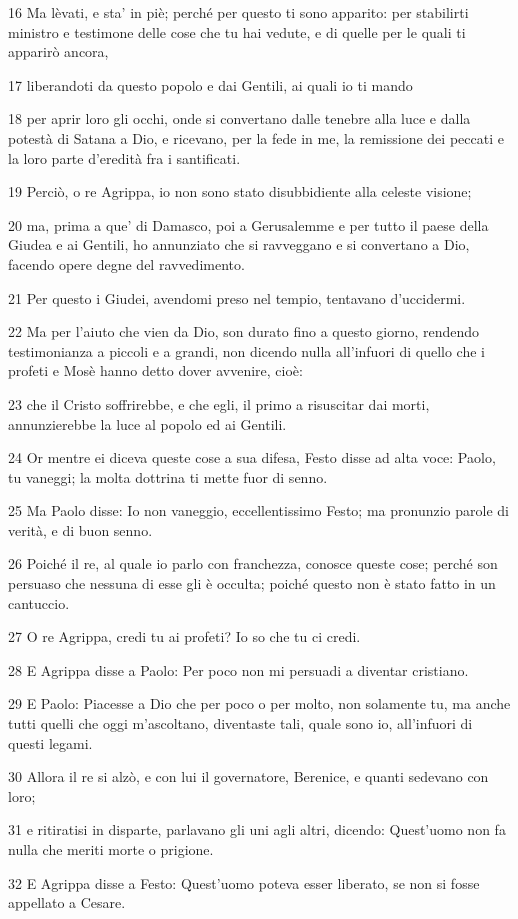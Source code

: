 \par 16 Ma lèvati, e sta' in piè; perché per questo ti sono apparito: per stabilirti ministro e testimone delle cose che tu hai vedute, e di quelle per le quali ti apparirò ancora,
\par 17 liberandoti da questo popolo e dai Gentili, ai quali io ti mando
\par 18 per aprir loro gli occhi, onde si convertano dalle tenebre alla luce e dalla potestà di Satana a Dio, e ricevano, per la fede in me, la remissione dei peccati e la loro parte d'eredità fra i santificati.
\par 19 Perciò, o re Agrippa, io non sono stato disubbidiente alla celeste visione;
\par 20 ma, prima a que' di Damasco, poi a Gerusalemme e per tutto il paese della Giudea e ai Gentili, ho annunziato che si ravveggano e si convertano a Dio, facendo opere degne del ravvedimento.
\par 21 Per questo i Giudei, avendomi preso nel tempio, tentavano d'uccidermi.
\par 22 Ma per l'aiuto che vien da Dio, son durato fino a questo giorno, rendendo testimonianza a piccoli e a grandi, non dicendo nulla all'infuori di quello che i profeti e Mosè hanno detto dover avvenire, cioè:
\par 23 che il Cristo soffrirebbe, e che egli, il primo a risuscitar dai morti, annunzierebbe la luce al popolo ed ai Gentili.
\par 24 Or mentre ei diceva queste cose a sua difesa, Festo disse ad alta voce: Paolo, tu vaneggi; la molta dottrina ti mette fuor di senno.
\par 25 Ma Paolo disse: Io non vaneggio, eccellentissimo Festo; ma pronunzio parole di verità, e di buon senno.
\par 26 Poiché il re, al quale io parlo con franchezza, conosce queste cose; perché son persuaso che nessuna di esse gli è occulta; poiché questo non è stato fatto in un cantuccio.
\par 27 O re Agrippa, credi tu ai profeti? Io so che tu ci credi.
\par 28 E Agrippa disse a Paolo: Per poco non mi persuadi a diventar cristiano.
\par 29 E Paolo: Piacesse a Dio che per poco o per molto, non solamente tu, ma anche tutti quelli che oggi m'ascoltano, diventaste tali, quale sono io, all'infuori di questi legami.
\par 30 Allora il re si alzò, e con lui il governatore, Berenice, e quanti sedevano con loro;
\par 31 e ritiratisi in disparte, parlavano gli uni agli altri, dicendo: Quest'uomo non fa nulla che meriti morte o prigione.
\par 32 E Agrippa disse a Festo: Quest'uomo poteva esser liberato, se non si fosse appellato a Cesare.

